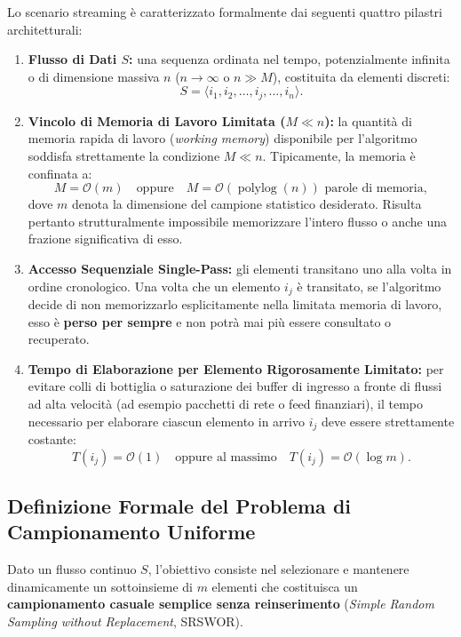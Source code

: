 Lo scenario streaming è caratterizzato formalmente dai seguenti quattro pilastri architetturali:
\begin{enumerate}
  \item \textbf{Flusso di Dati $S$:} una sequenza ordinata nel tempo, potenzialmente infinita o di dimensione massiva $n$ ($n \to \infty$ o $n \gg M$), costituita da elementi discreti:
  \begin{equation}
    S = \langle i_1, i_2, \dots, i_j, \dots, i_n \rangle.
  \end{equation}
  \item \textbf{Vincolo di Memoria di Lavoro Limitata ($M \ll n$):} la quantità di memoria rapida di lavoro (\textit{working memory}) disponibile per l'algoritmo soddisfa strettamente la condizione $M \ll n$. Tipicamente, la memoria è confinata a:
  \begin{equation}
    M = \mathcal{O}(m) \quad \text{oppure} \quad M = \mathcal{O}(\operatorname{polylog}(n)) \text{ parole di memoria},
  \end{equation}
  dove $m$ denota la dimensione del campione statistico desiderato. Risulta pertanto strutturalmente impossibile memorizzare l'intero flusso o anche una frazione significativa di esso.
  \item \textbf{Accesso Sequenziale Single-Pass:} gli elementi transitano uno alla volta in ordine cronologico. Una volta che un elemento $i_j$ è transitato, se l'algoritmo decide di non memorizzarlo esplicitamente nella limitata memoria di lavoro, esso è \textbf{perso per sempre} e non potrà mai più essere consultato o recuperato.
  \item \textbf{Tempo di Elaborazione per Elemento Rigorosamente Limitato:} per evitare colli di bottiglia o saturazione dei buffer di ingresso a fronte di flussi ad alta velocità (ad esempio pacchetti di rete o feed finanziari), il tempo necessario per elaborare ciascun elemento in arrivo $i_j$ deve essere strettamente costante:
  \begin{equation}
    T(i_j) = \mathcal{O}(1) \quad \text{oppure al massimo} \quad T(i_j) = \mathcal{O}(\log m).
  \end{equation}
\end{enumerate}

\FloatBarrier
\subsection{Definizione Formale del Problema di Campionamento Uniforme}
Dato un flusso continuo $S$, l'obiettivo consiste nel selezionare e mantenere dinamicamente un sottoinsieme di $m$ elementi che costituisca un \textbf{campionamento casuale semplice senza reinserimento} (\textit{Simple Random Sampling without Replacement}, SRSWOR).

